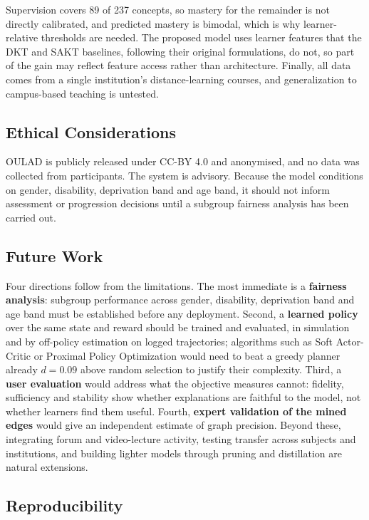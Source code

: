 \documentclass[conference]{IEEEtran}
\begin{document}
Supervision covers 89 of 237 concepts, so mastery for the remainder is not directly
calibrated, and predicted mastery is bimodal, which is why learner-relative thresholds are
needed. The proposed model uses learner features that the DKT and SAKT baselines, following
their original formulations, do not, so part of the gain may reflect feature access rather
than architecture. Finally, all data comes from a single institution's distance-learning
courses, and generalization to campus-based teaching is untested.

\subsection{Ethical Considerations}

OULAD is publicly released under CC-BY 4.0 and anonymised, and no data was collected from
participants. The system is advisory. Because the model conditions on gender, disability,
deprivation band and age band, it should not inform assessment or progression decisions
until a subgroup fairness analysis has been carried out.

\subsection{Future Work}

Four directions follow from the limitations. The most immediate is a \textbf{fairness
analysis}: subgroup performance across gender, disability, deprivation band and age band
must be established before any deployment. Second, a \textbf{learned policy} over the same
state and reward should be trained and evaluated, in simulation and by off-policy
estimation on logged trajectories; algorithms such as Soft Actor-Critic or Proximal Policy
Optimization would need to beat a greedy planner already $d = 0.09$ above random selection
to justify their complexity. Third, a \textbf{user evaluation} would address what the
objective measures cannot: fidelity, sufficiency and stability show whether explanations
are faithful to the model, not whether learners find them useful. Fourth, \textbf{expert
validation of the mined edges} would give an independent estimate of graph precision.
Beyond these, integrating forum and video-lecture activity, testing transfer across
subjects and institutions, and building lighter models through pruning and distillation
are natural extensions.

\subsection*{Reproducibility}
\end{document}
